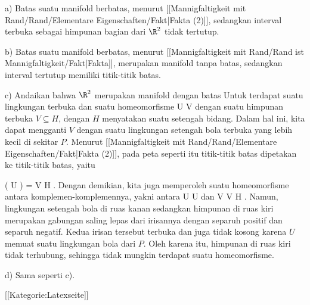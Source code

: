 a) Batas
 suatu manifold berbatas, menurut
[[Mannigfaltigkeit mit Rand/Rand/Elementare Eigenschaften/Fakt|Fakta (2)]],
sedangkan interval terbuka sebagai himpunan bagian dari $\R^2$ tidak tertutup.

b) Batas
 suatu manifold berbatas, menurut
[[Mannigfaltigkeit mit Rand/Rand ist Mannigfaltigkeit/Fakt|Fakta]],
merupakan manifold tanpa batas, sedangkan interval tertutup memiliki titik-titik batas.

c) Andaikan bahwa $\R^2$ merupakan manifold dengan batas
 Untuk
 terdapat suatu lingkungan terbuka
 dan suatu homeomorfisme
\maabbdisp {\alpha} { U } {V
} {}
dengan suatu himpunan terbuka $V \subseteq H$, dengan $H$ menyatakan suatu setengah bidang. Dalam hal ini, kita dapat mengganti $V$ dengan suatu lingkungan setengah bola terbuka yang lebih kecil di sekitar $P$. Menurut
[[Mannigfaltigkeit mit Rand/Rand/Elementare Eigenschaften/Fakt|Fakta (2)]],
pada peta seperti itu titik-titik batas dipetakan ke titik-titik batas, yaitu

\mavergleichskettedisp
{\vergleichskette
{\alpha ( U \cap \R  )
}
{ =} { V \cap \partial H
}
{ } {
}
{ } {
}
{ } {
}
}
{}{}{.}
Dengan demikian, kita juga memperoleh suatu homeomorfisme antara komplemen-komplemennya, yakni antara
\mathkor {} {U \setminus U \cap \R} {dan} {V \setminus V \cap \partial H} {.}
Namun, lingkungan setengah bola di ruas kanan
sedangkan himpunan di ruas kiri merupakan gabungan saling lepas dari irisannya dengan separuh positif dan separuh negatif. Kedua irisan tersebut terbuka dan juga tidak kosong karena $U$ memuat suatu lingkungan bola dari $P$. Oleh karena itu, himpunan di ruas kiri tidak terhubung, sehingga tidak mungkin terdapat suatu homeomorfisme.

d) Sama seperti c).

 [[Kategorie:Latexseite]]
